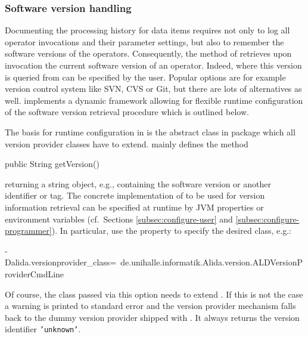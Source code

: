 
\subsubsection{Software version handling}
\label{subsec:version}
Documenting the processing history for data items requires not only to log all operator invocations and
their parameter settings, but also to remember the software versions of the operators.
Consequently, the method  of  retrieves upon invocation the current software version of
an operator. Indeed, where this version is queried from can be specified by the user. Popular
options are for example version control system like SVN, CVS or Git, but there are lots of
alternatives as well. \alida implements a dynamic framework allowing for
flexible runtime configuration of the software version retrieval procedure which
is outlined below.

The basis for runtime configuration in \alida is the abstract class 
in package  which all version provider classes have to extend. 
 mainly defines the method 

\begin{code}
  public String getVersion()
\end{code}

returning a string object, e.g., containing the software version or another identifier or tag. The concrete implementation of 
 to be used for version information retrieval can be specified at
runtime by JVM properties or environment variables (cf.~Sections
\ref{subsec:configure-user} and \ref{subsec:configure-programmer}). In
particular, use the property  to specify the desired class, e.g.:\\[0.1cm]
\begin{code}
  -Dalida.versionprovider_class=\
       de.unihalle.informatik.Alida.version.ALDVersionProviderCmdLine
\end{code}


Of course, the class passed via this option needs to extend . If this is
not the case a warning is printed to standard error and the version provider mechanism
falls back to the dummy version provider 
shipped with \alida. It always returns the version identifier {\tt 'unknown'}.

